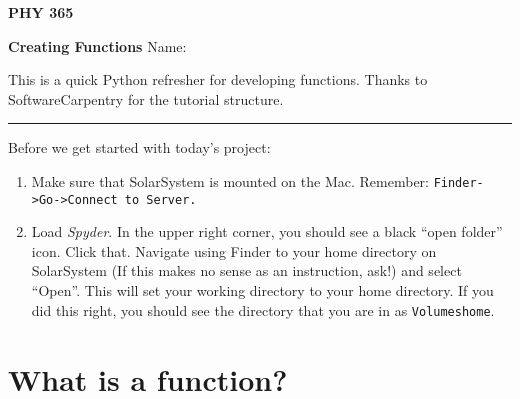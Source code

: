 \documentclass[]{article}
\renewcommand{\_}{\char`_}
\newcommand{\bs}{\symbol{92}}
\begin{document}
\pagestyle{empty}

\noindent
{\Large\bf PHY 365}
\vspace{4pt}

\noindent
{\Large\bf Creating Functions} \hfill {\large Name:} \hrulefill
\vspace{6pt}

\vspace{11pt}

\noindent This is a quick Python refresher for developing functions. Thanks to SoftwareCarpentry for the tutorial structure. 

\medskip\hrule

\medskip
Before we get started with today's project: 
\begin{enumerate}
\item Make sure that SolarSystem is mounted on the Mac. Remember: \texttt{Finder->Go->Connect to Server. }
\item Load \textit{Spyder}. In the upper right corner, you should see a black ``open folder'' icon. Click that. Navigate using Finder to your home directory on SolarSystem (If this makes no sense as an instruction, ask!) and select ``Open''. This will set your working directory to your home directory. If you did this right, you should see the directory that you are in as \texttt{\bs Volumes\bs home}.   
\end{enumerate}

\section{What is a function?}
\end{document}
